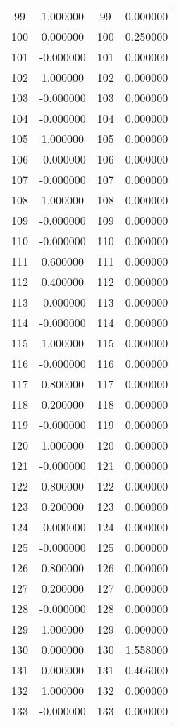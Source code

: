 \documentclass[12pt]{article}
\begin{document}
\begin{longtable}{@{}cccc@{}}
99 & 1.000000 & 99 & 0.000000 \\
100 & 0.000000 & 100 & 0.250000 \\
101 & -0.000000 & 101 & 0.000000 \\
102 & 1.000000 & 102 & 0.000000 \\
103 & -0.000000 & 103 & 0.000000 \\
104 & -0.000000 & 104 & 0.000000 \\
105 & 1.000000 & 105 & 0.000000 \\
106 & -0.000000 & 106 & 0.000000 \\
107 & -0.000000 & 107 & 0.000000 \\
108 & 1.000000 & 108 & 0.000000 \\
109 & -0.000000 & 109 & 0.000000 \\
110 & -0.000000 & 110 & 0.000000 \\
111 & 0.600000 & 111 & 0.000000 \\
112 & 0.400000 & 112 & 0.000000 \\
113 & -0.000000 & 113 & 0.000000 \\
114 & -0.000000 & 114 & 0.000000 \\
115 & 1.000000 & 115 & 0.000000 \\
116 & -0.000000 & 116 & 0.000000 \\
117 & 0.800000 & 117 & 0.000000 \\
118 & 0.200000 & 118 & 0.000000 \\
119 & -0.000000 & 119 & 0.000000 \\
120 & 1.000000 & 120 & 0.000000 \\
121 & -0.000000 & 121 & 0.000000 \\
122 & 0.800000 & 122 & 0.000000 \\
123 & 0.200000 & 123 & 0.000000 \\
124 & -0.000000 & 124 & 0.000000 \\
125 & -0.000000 & 125 & 0.000000 \\
126 & 0.800000 & 126 & 0.000000 \\
127 & 0.200000 & 127 & 0.000000 \\
128 & -0.000000 & 128 & 0.000000 \\
129 & 1.000000 & 129 & 0.000000 \\
130 & 0.000000 & 130 & 1.558000 \\
131 & 0.000000 & 131 & 0.466000 \\
132 & 1.000000 & 132 & 0.000000 \\
133 & -0.000000 & 133 & 0.000000 \\

\end{longtable}
\end{document}
